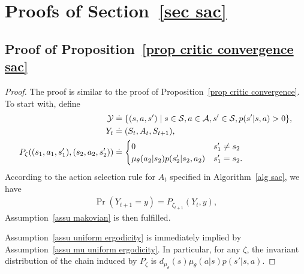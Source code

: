 \documentclass[twoside,11pt]{article}
\newcommand{\fS}{\mathcal{S}}
\newcommand{\fA}{\mathcal{A}}
\newcommand{\fY}{\mathcal{Y}}
\numberwithin{assucounter}{section}
\begin{document}
\section{Proofs of Section~\ref{sec sac}}
\subsection{Proof of Proposition~\ref{prop critic convergence sac}}
\label{sec proof prop critic convergence sac}
\propcriticconvergencesac*
\begin{proof}
  The proof is similar to the proof of Proposition~\ref{prop critic convergence}.
  To start with,
  define
  \begin{align}
    \fY &\doteq \qty{(s, a, s') \mid s \in \fS, a \in \fA, s' \in \fS, p(s'|s, a) > 0}, \\
    Y_t &\doteq (S_t, A_t, S_{t+1}), \\
    P_{\zeta}((s_1, a_1, s_1'), (s_2, a_2, s_2')) &\doteq \begin{cases}
      0 & s_1' \neq s_2 \\
      \mu_\theta(a_2|s_2) p(s_2'|s_2, a_2) & s_1' = s_2.
    \end{cases}
  \end{align} 
  According to the action selection rule for $A_{t}$ specified in Algorithm~\ref{alg sac},
  we have
  \begin{align}
    \Pr(Y_{t+1} = y) = P_{\zeta_{t+1}}(Y_t, y),
  \end{align}
  Assumption~\ref{assu makovian} is then fulfilled.

  Assumption~\ref{assu uniform ergodicity} is immediately implied by Assumption~\ref{assu mu uniform ergodicity}.
  In particular, 
  for any $\zeta$,
  the invariant distribution of 
  the chain induced by $P_\zeta$ is $d_{\mu_\theta}(s)\mu_\theta(a|s)p(s'|s, a)$.


\end{proof}
\end{document}
